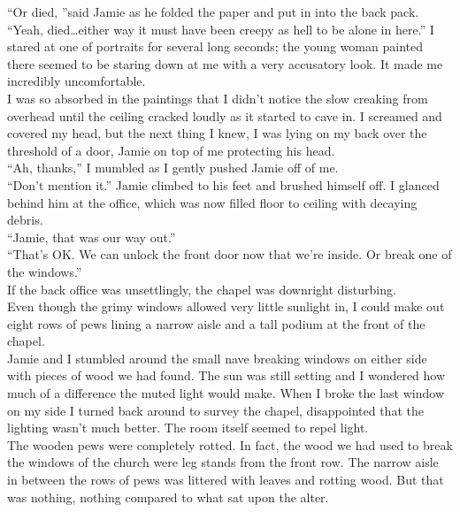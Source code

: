 \documentclass[a5paper]{scrartcl}
\begin{document}
\enquote{Or died, }said Jamie as he folded the paper and put in into the back pack. \\


\enquote{Yeah, died\dots either way it must have been creepy as hell to be alone in here.} I stared at one of portraits for several long seconds; the young woman painted there seemed to be staring down at me with a very accusatory look. It made me incredibly uncomfortable. \\


I was so absorbed in the paintings that I didn't notice the slow creaking from overhead until the ceiling cracked loudly as it started to cave in. I screamed and covered my head, but the next thing I knew, I was lying on my back over the threshold of a door, Jamie on top of me protecting his head. \\


\enquote{Ah, thanks,} I mumbled as I gently pushed Jamie off of me. \\

\enquote{Don't mention it.} Jamie climbed to his feet and brushed himself off.
I glanced behind him at the office, which was now filled floor to ceiling with decaying debris.\\

\enquote{Jamie, that was our way out.} \\


\enquote{That's OK. We can unlock the front door now that we're inside. Or break one of the windows.}\\


If the back office was unsettlingly, the chapel was downright disturbing.\\


Even though the grimy windows allowed very little sunlight in, I could make out eight rows of pews lining a narrow aisle and a tall podium at the front of the chapel.\\


Jamie and I stumbled around the small nave breaking windows on either side with pieces of wood we had found. The sun was still setting and I wondered how much of a difference the muted light would make. When I broke the last window on my side I turned back around to survey the chapel, disappointed that the lighting wasn't much better. The room itself seemed to repel light.\\


The wooden pews were completely rotted. In fact, the wood we had used to break the windows of the church were leg stands from the front row. The narrow aisle in between the rows of pews was littered with leaves and rotting wood. But that was nothing, nothing compared to what sat upon the alter. \\
\end{document}

